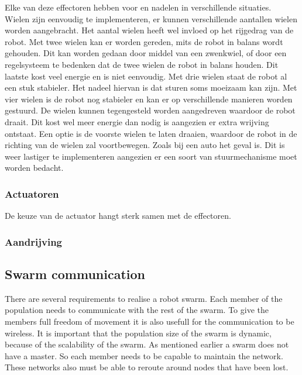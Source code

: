\documentclass[10pt,a4paper]{article}
\begin{document}
  
Elke van deze effectoren hebben voor en nadelen in verschillende situaties.\\Wielen zijn eenvoudig te implementeren, er kunnen verschillende aantallen wielen worden aangebracht. Het aantal wielen heeft wel invloed op het rijgedrag van de robot. Met twee wielen kan er worden gereden, mits de robot in balans wordt gehouden. Dit kan worden gedaan door middel van een zwenkwiel, of door een regelsysteem te bedenken dat de twee wielen de robot in balans houden. Dit laatste kost veel energie en is niet eenvoudig. Met drie wielen staat de robot al een stuk stabieler. Het nadeel hiervan is dat sturen soms moeizaam kan zijn. Met vier wielen is de robot nog stabieler en kan er op verschillende manieren worden gestuurd. De wielen kunnen tegengesteld worden aangedreven waardoor de robot draait. Dit kost wel meer energie dan nodig is aangezien er extra wrijving ontstaat. Een optie is de voorste wielen te laten draaien, waardoor de robot in de richting van de wielen zal voortbewegen. Zoals bij een auto het geval is. Dit is weer lastiger te implementeren aangezien er een soort van stuurmechanisme moet worden bedacht. 

\subsubsection{Actuatoren}

De keuze van de actuator hangt sterk samen met de effectoren.

\subsubsection{Aandrijving}

\newpage
\subsection{Swarm communication}
There are several requirements to realise a robot swarm. Each member of the population needs to communicate with the rest of the swarm. To give the members full freedom of movement it is also usefull for the communication to be wireless. It is important that the population size of the swarm is dynamic, because of the scalability of the swarm. As mentioned earlier a swarm does not have a master. So each member needs to be capable to maintain the network. These networks also must be able to reroute around nodes that have been lost. \cite{Swarmwiki}\cite{swarmintelligence}
\end{document}
